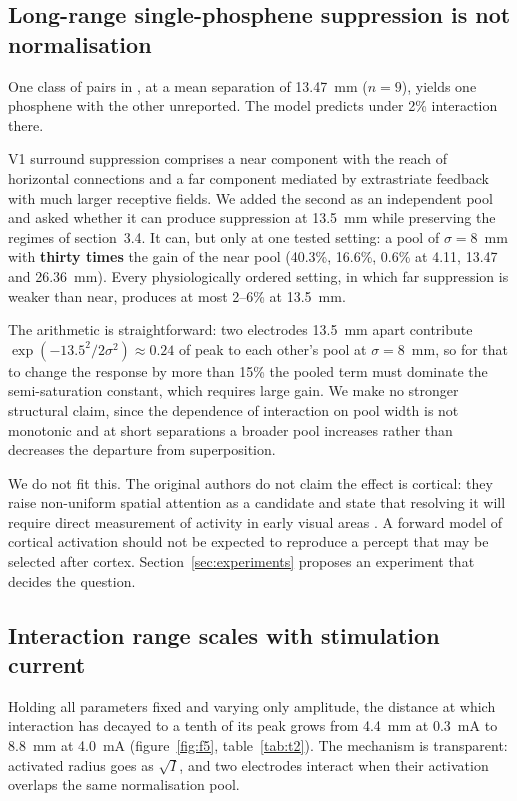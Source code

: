 \documentclass[10pt,twocolumn]{article}
\begin{document}
\subsection{Long-range single-phosphene suppression is not normalisation}
\label{sec:s35}

One class of pairs in \citep{bosking2022}, at a mean separation of
13.47~mm ($n=9$), yields one phosphene with the other unreported. The model
predicts under 2\% interaction there.

V1 surround suppression comprises a near component with the reach of
horizontal connections and a far component mediated by extrastriate
feedback with much larger receptive fields. We added the second as an
independent pool and asked whether it can produce suppression at 13.5~mm
while preserving the regimes of section~3.4. It can, but only at one tested
setting: a pool of $\sigma = 8$~mm with \textbf{thirty times} the gain of
the near pool (40.3\%, 16.6\%, 0.6\% at 4.11, 13.47 and 26.36~mm). Every
physiologically ordered setting, in which far suppression is weaker than
near, produces at most 2--6\% at 13.5~mm.

The arithmetic is straightforward: two electrodes 13.5~mm apart contribute
$\exp(-13.5^2/2\sigma^2)\approx0.24$ of peak to each other's pool at
$\sigma=8$~mm, so for that to change the response by more than 15\% the
pooled term must dominate the semi-saturation constant, which requires
large gain. We make no stronger structural claim, since the dependence of
interaction on pool width is not monotonic and at short separations a
broader pool increases rather than decreases the departure from
superposition.

We do not fit this. The original authors do not claim the effect is
cortical: they raise non-uniform spatial attention as a candidate and state
that resolving it will require direct measurement of activity in early
visual areas \citep{bosking2022}. A forward model of cortical activation
should not be expected to reproduce a percept that may be selected after
cortex. Section~\ref{sec:experiments} proposes an experiment that decides
the question.

\subsection{Interaction range scales with stimulation current}

Holding all parameters fixed and varying only amplitude, the distance at
which interaction has decayed to a tenth of its peak grows from 4.4~mm at
0.3~mA to 8.8~mm at 4.0~mA (figure~\ref{fig:f5}, table~\ref{tab:t2}). The
mechanism is transparent: activated radius goes as $\sqrt{I}$, and two
electrodes interact when their activation overlaps the same normalisation
pool.
\end{document}

